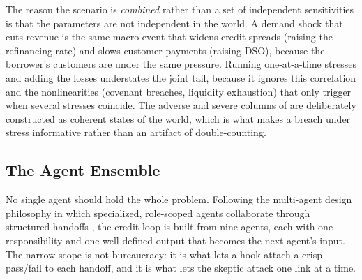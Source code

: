 \begin{deepdive}
The reason the scenario is \emph{combined} rather than a set of independent
sensitivities is that the parameters are not independent in the world. A demand
shock that cuts revenue is the same macro event that widens credit spreads (raising
the refinancing rate) and slows customer payments (raising DSO), because the
borrower's customers are under the same pressure. Running one-at-a-time stresses and
adding the losses understates the joint tail, because it ignores this correlation
and the nonlinearities (covenant breaches, liquidity exhaustion) that only
trigger when several stresses coincide. The adverse and severe columns of
 are deliberately constructed as coherent states of the
world, which is what makes a breach under stress informative rather than an
artifact of double-counting.
\end{deepdive}

\subsection{The Agent Ensemble}\label{subsec:credit-agents}

No single agent should hold the whole problem. Following the multi-agent design
philosophy in which specialized, role-scoped agents collaborate through structured
handoffs \citep{wu2023autogen,xi2023rise}, the credit loop is built from nine
agents, each with one responsibility and one well-defined output that becomes the
next agent's input. The narrow scope is not bureaucracy: it is what lets a hook
attach a crisp pass/fail to each handoff, and it is what lets the skeptic attack one
link at a time.

